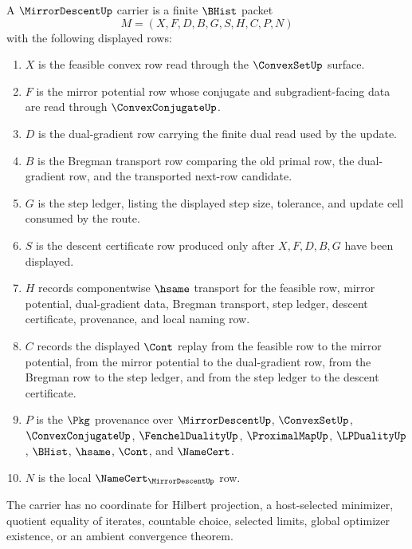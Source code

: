 \begin{definition}
\label{def:mirror-descent-carrier}
A $\MirrorDescentUp$ carrier is a finite $\BHist$ packet
$$
M=(X,F,D,B,G,S,H,C,P,N)
$$
with the following displayed rows:
\begin{enumerate}
\item $X$ is the feasible convex row read through the $\ConvexSetUp$ surface.
\item $F$ is the mirror potential row whose conjugate and subgradient-facing data are read through $\ConvexConjugateUp$.
\item $D$ is the dual-gradient row carrying the finite dual read used by the update.
\item $B$ is the Bregman transport row comparing the old primal row, the dual-gradient row, and the transported next-row candidate.
\item $G$ is the step ledger, listing the displayed step size, tolerance, and update cell consumed by the route.
\item $S$ is the descent certificate row produced only after $X,F,D,B,G$ have been displayed.
\item $H$ records componentwise $\hsame$ transport for the feasible row, mirror potential, dual-gradient data, Bregman transport, step ledger, descent certificate, provenance, and local naming row.
\item $C$ records the displayed $\Cont$ replay from the feasible row to the mirror potential, from the mirror potential to the dual-gradient row, from the Bregman row to the step ledger, and from the step ledger to the descent certificate.
\item $P$ is the $\Pkg$ provenance over $\MirrorDescentUp$, $\ConvexSetUp$, $\ConvexConjugateUp$, $\FenchelDualityUp$, $\ProximalMapUp$, $\LPDualityUp$, $\BHist$, $\hsame$, $\Cont$, and $\NameCert$.
\item $N$ is the local $\NameCert_{\MirrorDescentUp}$ row.
\end{enumerate}
The carrier has no coordinate for Hilbert projection, a host-selected minimizer, quotient equality of iterates, countable choice, selected limits, global optimizer existence, or an ambient convergence theorem.
\end{definition}

